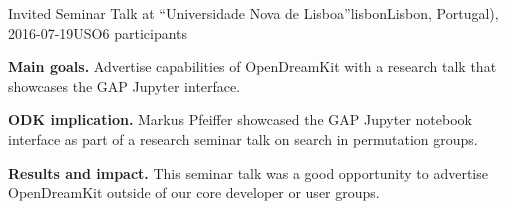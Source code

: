 \begin{event}{Invited Seminar Talk at ``Universidade Nova de
    Lisboa''}{lisbon}{Lisbon, Portugal), 2016-07-19}{USO}{6 participants}{}

\textbf{Main goals.} Advertise capabilities of OpenDreamKit with a research talk
that showcases the GAP Jupyter interface.

\textbf{ODK implication.} Markus Pfeiffer showcased the GAP Jupyter notebook
interface as part of a research seminar talk on search in permutation groups.

\textbf{Results and impact.} 
This seminar talk was a good opportunity to advertise OpenDreamKit outside of
our core developer or user groups.

\end{event}
